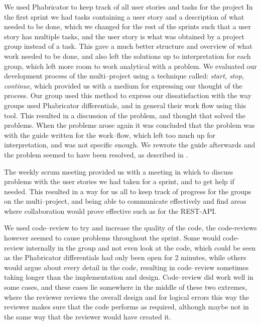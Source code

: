 We used Phabricator to keep track of all user stories and tasks for the project
In the first sprint we had tasks containing a user story and a description of what needed to be done, which we changed for the rest of the sprints such that a user story has multiple tasks, and the user story is what was obtained by a project group instead of a task.
This gave a much better structure and overview of what work needed to be done, and also left the solutions up to interpretation for each group, which left more room to work analytical with a problem.
We evaluated our development process of the multi--project using a technique called: \textit{start, stop, continue}, which provided us with a medium for expressing our thought of the process.
Our group used this method to express our dissatisfaction with the way groups used Phabricator differentials, and in general their work flow using this tool.
This resulted in a discussion of the problem, and thought that solved the problems.
When the problems arose again it was concluded that the problem was with the guide written for the work--flow, which left too much up for interpretation, and was not specific enough.
We rewrote the guide afterwards and the problem seemed to have been resolved, as described in .

The weekly scrum meeting provided us with a meeting in which to discuss problems with the user stories we had taken for a sprint, and to get help if needed.
This resulted in a way for us all to keep track of progress for the groups on the multi--project, and being able to communicate effectively and find areas where collaboration would prove effective such as for the REST-API.

We used code--review to try and increase the quality of the code, the code-reviews however seemed to cause problems throughout the sprint.
Some would code-review internally in the group and not even look at the code, which could be seen as the Phabricator differentials had only been open for 2 minutes, while others would argue about every detail in the code, resulting in code--review sometimes taking longer than the implementation and design.
Code--review did work well in some cases, and these cases lie somewhere in the middle of these two extremes, where the reviewer reviews the overall design and for logical errors this way the reviewer makes sure that the code performs as required, although maybe not in the same way that the reviewer would have created it.

